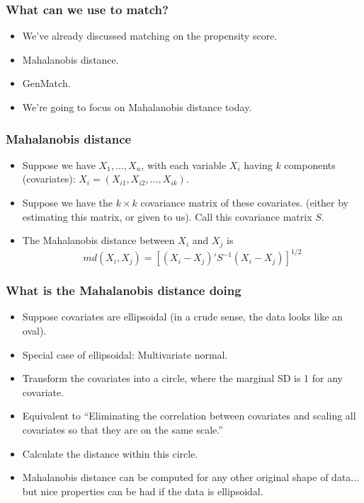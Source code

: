 \documentclass{beamer}
\begin{document}
\begin{frame}[c]\frametitle{What can we use to match?}
  \begin{itemize}
   \item<1->  We've already discussed matching on the propensity score.
   \item<2->  Mahalanobis distance.
   \item<2->  GenMatch.
   \item<3->  We're going to focus on Mahalanobis distance today.
 \end{itemize}
\end{frame}

\begin{frame}[c]\frametitle{Mahalanobis distance}
  \begin{itemize}
    \item<1-> Suppose we have $X_1,\ldots, X_n$, with each 
    variable $X_i$ having $k$ components (covariates):
    $X_i = (X_{i1},X_{i2},\ldots,X_{ik})$.
    \item<1-> Suppose we have the $k \times k$ covariance matrix of these covariates.
     (either by estimating this matrix, or given to us).  
     Call this covariance matrix $S$.
   \item<2->
     The Mahalanobis distance between $X_i$ and $X_j$ is
     $$
       md(X_i,X_j) = [(X_i - X_j)'S^{-1}(X_i - X_j)]^{1/2}
     $$
  \end{itemize}	
\end{frame}

\begin{frame}[c]\frametitle{What is the Mahalanobis distance doing}
  \begin{itemize}
    \item<1-> Suppose covariates are ellipsoidal (in a crude sense, the data looks like an oval).
    \item<1-> Special case of ellipsoidal: Multivariate normal.
    \item<2-> Transform the covariates into a circle, where the marginal SD is 1 for any covariate.
    \item<2-> Equivalent to ``Eliminating the correlation between covariates 
      and scaling all covariates so that they are on the same scale.''
    \item<3-> Calculate the distance within this circle.
    \item<3-> Mahalanobis distance can be computed for any other original shape of data... 
       but nice properties can be had if the data is ellipsoidal.
  \end{itemize}	
\end{frame}
\end{document}
